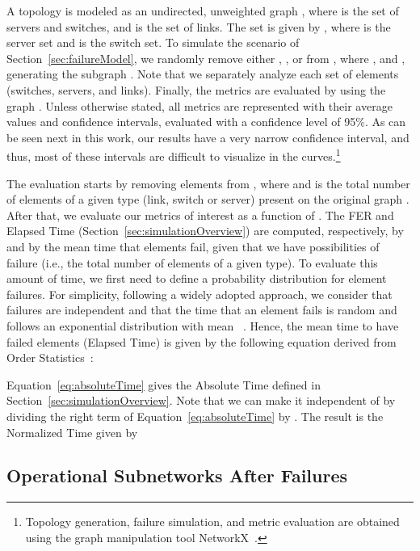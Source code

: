 A topology is modeled as an undirected, unweighted graph , where  is the set of servers and switches, and  is the set of links. The set  is given by , where  is the server set and  is the switch set. To simulate the scenario of Section~\ref{sec:failureModel}, we randomly remove either , , or  from , where ,  and , generating the subgraph . Note that we separately analyze each set of elements (switches, servers, and links). Finally, the metrics are evaluated by using the graph . Unless otherwise stated, all metrics are represented with their average values and confidence intervals, evaluated with a confidence level of 95\%. As can be seen next in this work, our results have a very narrow confidence interval, and thus, most of these intervals are difficult to visualize in the curves.\footnote{Topology generation, failure simulation, and metric evaluation are obtained using the graph manipulation tool NetworkX~\cite{hagberg2008exploring}.}

The evaluation starts by removing  elements from , where  and  is the total number of elements of a given type (link, switch or server) present on the original graph . After that, we evaluate our metrics of interest as a function of . The FER and Elapsed Time (Section~\ref{sec:simulationOverview}) are computed, respectively, by  and by the mean time that  elements fail, given that we have  possibilities of failure (i.e., the total number of elements of a given type). To evaluate this amount of time, we first need to define a probability distribution for element failures. For simplicity, following a widely adopted approach, we consider that failures are independent and that the time  that an element fails is random and follows an exponential distribution with mean ~\cite{egeland2009availability,rahman2010survivable}. 
Hence, the mean time to have  failed elements (Elapsed Time) is given by the following equation derived from Order Statistics~\cite{barlow1975statistical}: 

Equation~\ref{eq:absoluteTime} gives the Absolute Time defined in Section~\ref{sec:simulationOverview}. Note that we can make it independent of  by dividing the right term of Equation~\ref{eq:absoluteTime} by . The result is the Normalized Time given by

\subsection{Operational Subnetworks After Failures}
\label{sec:operational}

